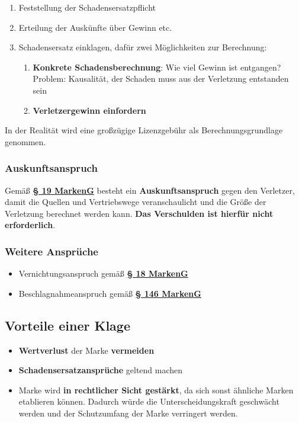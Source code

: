 \documentclass[12pt,A4]{extarticle}
\newcommand{\markenG}[2][]{\textbf{\textcolor{markenGesetzLink}{\href{https://www.gesetze-im-internet.de/markeng/__#2.html}{§ #2 \ifthenelse{\equal{#1}{}}{}{#1 }MarkenG}}}}
\begin{document}
\begin{enumerate}
  \item{Feststellung der Schadensersatzpflicht}
  \item{Erteilung der Auskünfte über Gewinn etc.}
  \item{Schadensersatz einklagen, dafür zwei Möglichkeiten zur Berechnung:
              \begin{enumerate}
                \item{\textbf{Konkrete Schadensberechnung}: Wie viel Gewinn ist entgangen? Problem: Kausalität, der Schaden muss aus der Verletzung entstanden sein}
                \item{\textbf{Verletzergewinn einfordern}}
              \end{enumerate}
        }
\end{enumerate}
In der Realität wird eine großzügige Lizenzgebühr als Berechnungsgrundlage genommen.

\subsubsection{Auskunftsanspruch}
Gemäß \markenG{19} besteht ein \textbf{Auskunftsanspruch} gegen den Verletzer, damit die Quellen und Vertriebswege veranschaulicht und die Größe der Verletzung berechnet werden kann. \textbf{Das Verschulden ist hierfür nicht erforderlich}.

\subsubsection{Weitere Ansprüche}
\begin{itemize}
  \item{Vernichtungsanspruch gemäß \markenG{18}}
  \item{Beschlagnahmeanspruch gemäß \markenG{146}}
\end{itemize}

\subsection{Vorteile einer Klage}
\begin{itemize}
  \item{\textbf{Wertverlust} der Marke \textbf{vermeiden}}
  \item{\textbf{Schadensersatzansprüche} geltend machen}
  \item{Marke wird \textbf{in rechtlicher Sicht gestärkt}, da sich sonst ähnliche Marken etablieren können. Dadurch würde die Unterscheidungskraft geschwächt werden und der Schutzumfang der Marke verringert werden.}
\end{itemize}
\end{document}
